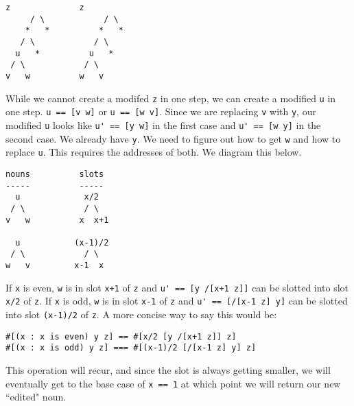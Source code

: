 \documentclass[twoside]{article}
\begin{document}
\begin{lstlisting}[style=listingblock]
      z              z
     / \            / \
    *   *          *   *
   / \            / \
  u   *          u   *
 / \            / \
v   w          w   v
\end{lstlisting}

While we cannot create a modifed \lstinline[style=inlinecode]{z} in one step, we can create a modified \lstinline[style=inlinecode]{u} in one step. \lstinline[style=inlinecode]{u == [v w]} or \lstinline[style=inlinecode]{u == [w v]}. Since we are replacing \lstinline[style=inlinecode]{v} with \lstinline[style=inlinecode]{y}, our modified \lstinline[style=inlinecode]{u} looks like \lstinline[style=inlinecode]{u' == [y w]} in the first case and \lstinline[style=inlinecode]{u' == [w y]} in the second case. We already have \lstinline[style=inlinecode]{y}. We need to figure out how to get \lstinline[style=inlinecode]{w} and how to replace \lstinline[style=inlinecode]{u}. This requires the addresses of both. We diagram this below.

\begin{lstlisting}[style=listingblock]
nouns          slots
-----          -----
  u             x/2
 / \            / \ 
v   w          x  x+1

  u           (x-1)/2
 / \            / \
w   v         x-1  x
\end{lstlisting}

If \lstinline[style=inlinecode]{x} is even, \lstinline[style=inlinecode]{w} is in slot \lstinline[style=inlinecode]{x+1} of \lstinline[style=inlinecode]{z} and \lstinline[style=inlinecode]{u' == [y /[x+1 z]]} can be slotted into slot \lstinline[style=inlinecode]{x/2} of \lstinline[style=inlinecode]{z}. If \lstinline[style=inlinecode]{x} is odd, \lstinline[style=inlinecode]{w} is in slot \lstinline[style=inlinecode]{x-1} of \lstinline[style=inlinecode]{z} and \lstinline[style=inlinecode]{u' == [/[x-1 z] y]} can be slotted into slot \lstinline[style=inlinecode]{(x-1)/2} of \lstinline[style=inlinecode]{z}. A more concise way to say this would be:

\begin{lstlisting}[style=listingblock]
#[(x : x is even) y z] == #[x/2 [y /[x+1 z]] z]
#[(x : x is odd) y z] === #[(x-1)/2 [/[x-1 z] y] z]
\end{lstlisting}

This operation will recur, and since the slot is always getting smaller, we will eventually get to the base case of \lstinline[style=inlinecode]{x == 1} at which point we will return our new ``edited" noun.
\end{document}
